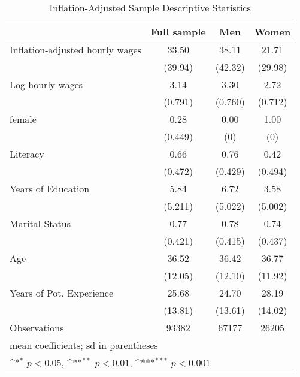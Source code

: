 \begin{table}[htbp]\centering
\def\sym#1{\ifmmode^{#1}\else\(^{#1}\)\fi}
\caption{Inflation-Adjusted Sample Descriptive Statistics}
\begin{tabular}{l*{3}{c}}
\toprule
                &\multicolumn{1}{c}{Full sample}&\multicolumn{1}{c}{Men}&\multicolumn{1}{c}{Women}\\
\midrule
Inflation-adjusted hourly wages&    33.50         &    38.11         &    21.71         \\
                &  (39.94)         &  (42.32)         &  (29.98)         \\
\addlinespace
Log hourly wages&     3.14         &     3.30         &     2.72         \\
                &  (0.791)         &  (0.760)         &  (0.712)         \\
\addlinespace
female          &     0.28         &     0.00         &     1.00         \\
                &  (0.449)         &      (0)         &      (0)         \\
\addlinespace
Literacy        &     0.66         &     0.76         &     0.42         \\
                &  (0.472)         &  (0.429)         &  (0.494)         \\
\addlinespace
Years of Education&     5.84         &     6.72         &     3.58         \\
                &  (5.211)         &  (5.022)         &  (5.002)         \\
\addlinespace
Marital Status  &     0.77         &     0.78         &     0.74         \\
                &  (0.421)         &  (0.415)         &  (0.437)         \\
\addlinespace
Age             &    36.52         &    36.42         &    36.77         \\
                &  (12.05)         &  (12.10)         &  (11.92)         \\
\addlinespace
Years of Pot. Experience&    25.68         &    24.70         &    28.19         \\
                &  (13.81)         &  (13.61)         &  (14.02)         \\
\midrule
Observations    &    93382         &    67177         &    26205         \\
\bottomrule
\multicolumn{4}{l}{\footnotesize mean coefficients; sd in parentheses}\\
\multicolumn{4}{l}{\footnotesize \sym{*} \(p<0.05\), \sym{**} \(p<0.01\), \sym{***} \(p<0.001\)}\\
\end{tabular}
\end{table}
